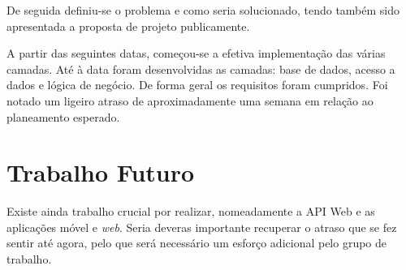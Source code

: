 De seguida definiu-se o problema e como seria solucionado, tendo também sido apresentada a proposta de projeto publicamente.

A partir das seguintes datas, começou-se a efetiva implementação das várias camadas. Até à data foram desenvolvidas as camadas: base de dados, acesso a dados e lógica de negócio. De forma geral os requisitos foram cumpridos. Foi notado um ligeiro atraso de aproximadamente uma semana em relação ao planeamento esperado.

\section{Trabalho Futuro}\label{sec43}

Existe ainda trabalho crucial por realizar, nomeadamente a API Web e as aplicações móvel e \textit{web}. Seria deveras importante recuperar o atraso que se fez sentir até agora, pelo que será necessário um esforço adicional pelo grupo de trabalho.